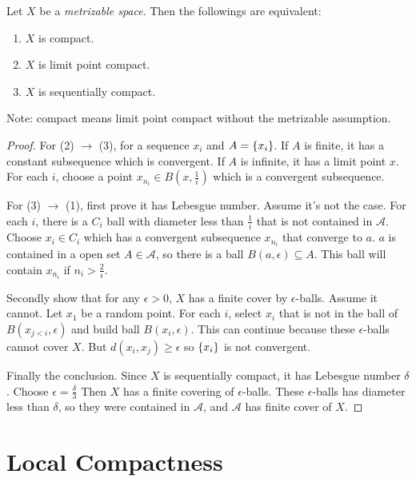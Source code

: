\begin{theorem}
    Let $X$ be a \emph{metrizable space}. Then the followings are equivalent:
    \begin{enumerate}
        \item $X$ is compact.
        \item $X$ is limit point compact.
        \item $X$ is sequentially compact.
    \end{enumerate}
    
    Note: compact means limit point compact without the metrizable assumption.
\end{theorem}
\begin{proof}
    For (2) $\rightarrow$ (3), for a sequence $x_i$ and $A = \set{x_i}$. If $A$ is finite, it has a constant subsequence which is convergent. If $A$ is infinite, it has a limit point $x$. For each $i$, choose a point $x_{n_i} \in B(x, \frac{1}{i})$ which is a convergent subsequence.
    
    For (3) $\rightarrow$ (1), first prove it has Lebesgue number. Assume it's not the case. For each $i$, there is a $C_i$ ball with diameter less than $\frac{1}{i}$ that is not contained in $\mathcal{A}$. Choose $x_i \in C_i$ which has a convergent subsequence $x_{n_i}$ that converge to $a$. $a$ is contained in a open set $A \in \mathcal{A}$, so there is a ball $B(a, \epsilon) \subseteq A$. This ball will contain $x_{n_i}$ if $n_i > \frac{2}{\epsilon}$.
    
    Secondly show that for any $\epsilon > 0$, $X$ has a finite cover by $\epsilon$-balls. Assume it cannot. Let $x_1$ be a random point. For each $i$, select $x_i$ that is not in the ball of $B(x_{j < i}, \epsilon)$ and build ball $B(x_i, \epsilon)$. This can continue because these $\epsilon$-balls cannot cover $X$. But $d(x_i, x_j) \geq \epsilon$ so $\set{x_i}$ is not convergent.
    
    Finally the conclusion. Since $X$ is sequentially compact, it has Lebesgue number $\delta$. Choose $\epsilon = \frac{\delta}{3}$ Then $X$ has a finite covering of $\epsilon$-balls. These $\epsilon$-balls has diameter less than $\delta$, so they were contained in $\mathcal{A}$, and $\mathcal{A}$ has finite cover of $X$.
\end{proof}


\section{Local Compactness}

